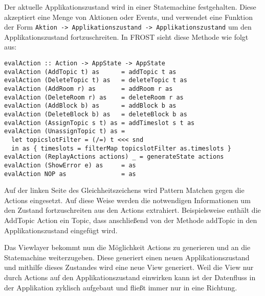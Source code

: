 Der aktuelle Applikationszustand wird in einer Statemachine festgehalten. Diese
akzeptiert eine Menge von Aktionen oder Events, und verwendet eine Funktion der
Form \texttt{Aktion -> Applikationszustand -> Applikationszustand} um den
Applikationszustand fortzuschreiten. In FROST sieht diese Methode wie folgt aus:
\begin{lstlisting}
evalAction :: Action -> AppState -> AppState
evalAction (AddTopic t) as      = addTopic t as
evalAction (DeleteTopic t) as   = deleteTopic t as
evalAction (AddRoom r) as       = addRoom r as
evalAction (DeleteRoom r) as    = deleteRoom r as
evalAction (AddBlock b) as      = addBlock b as
evalAction (DeleteBlock b) as   = deleteBlock b as
evalAction (AssignTopic s t) as = addTimeslot s t as
evalAction (UnassignTopic t) as =
  let topicslotFilter = (/=) t <<< snd
  in as { timeslots = filterMap topicslotFilter as.timeslots }
evalAction (ReplayActions actions) _ = generateState actions
evalAction (ShowError e) as     = as
evalAction NOP as               = as
\end{lstlisting}

Auf der linken Seite des Gleichheitszeichens wird Pattern Matchen gegen die
Actions eingesetzt. Auf diese Weise werden die notwendigen Informationen um den
Zustand fortzuschreiten aus den Actions extrahiert. Beispielsweise enthält die
AddTopic Action ein Topic, dass anschließend von der Methode addTopic in den
Applikationszustand eingefügt wird.

Das Viewlayer bekommt nun die Möglichkeit Actions zu generieren und an die
Statemachine weiterzugeben. Diese generiert einen neuen Applikationszustand und
mithilfe dieses Zustandes wird eine neue View generiert. Weil die View nur durch
Actions auf den Applikationszustand einwirken kann ist der Datenfluss in der
Applikation zyklisch aufgebaut und fließt immer nur in eine Richtung.

